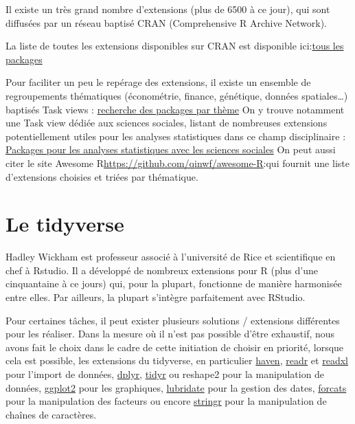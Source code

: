 \documentclass[
]{book}
\begin{document}
Il existe un très grand nombre d'extensions (plus de 6500 à ce jour), qui sont diffusées par un réseau baptisé CRAN (Comprehensive R Archive Network).

La liste de toutes les extensions disponibles sur CRAN est disponible ici:\href{https://cran.r-project.org/web/packages/available_packages_by_date.html}{tous les packages}

Pour faciliter un peu le repérage des extensions, il existe un ensemble de regroupements thématiques (économétrie, finance, génétique, données spatiales\ldots) baptisés Task views :
\href{http://cran.r-project.org/web/views/}{recherche des packages par thème}
On y trouve notamment une Task view dédiée aux sciences sociales, listant de nombreuses extensions potentiellement utiles pour les analyses statistiques dans ce champ disciplinaire :
\href{http://cran.r-project.org/web/views/SocialSciences.html.}{Packages pour les analyses statistiques avec les sciences sociales}
On peut aussi citer le site Awesome R\url{https://github.com/qinwf/awesome-R}:qui fournit une liste d'extensions choisies et triées par thématique.

\hypertarget{le-tidyverse}{%
\section{Le tidyverse}\label{le-tidyverse}}

Hadley Wickham est professeur associé à l'université de Rice et scientifique en chef à Rstudio. Il a développé de nombreux extensions pour R (plus d'une cinquantaine à ce jours) qui, pour la plupart, fonctionne de manière harmonisée entre elles. Par ailleurs, la plupart s'intègre parfaitement avec RStudio.

Pour certaines tâches, il peut exister plusieurs solutions / extensions différentes pour les réaliser. Dans la mesure où il n'est pas possible d'être exhaustif, nous avons fait le choix dans le cadre de cette initiation de choisir en priorité, lorsque cela est possible, les extensions du tidyverse, en particulier \href{http://rdrr.io/pkg/haven}{haven}, \href{http://rdrr.io/pkg/readr}{readr} et \href{http://rdrr.io/pkg/readxl}{readxl} pour l'import de données, \href{http://rdrr.io/pkg/dplyr}{dplyr}, \href{http://rdrr.io/pkg/dplyr}{tidyr} ou reshape2 pour la manipulation de données, \href{}{ggplot2} pour les graphiques, \href{http://rdrr.io/pkg/lubridate}{lubridate} pour la gestion des dates, \href{http://rdrr.io/pkg/forcats}{forcats} pour la manipulation des facteurs ou encore \href{http://rdrr.io/pkg/stringr}{stringr} pour la manipulation de chaînes de caractères.
\end{document}
